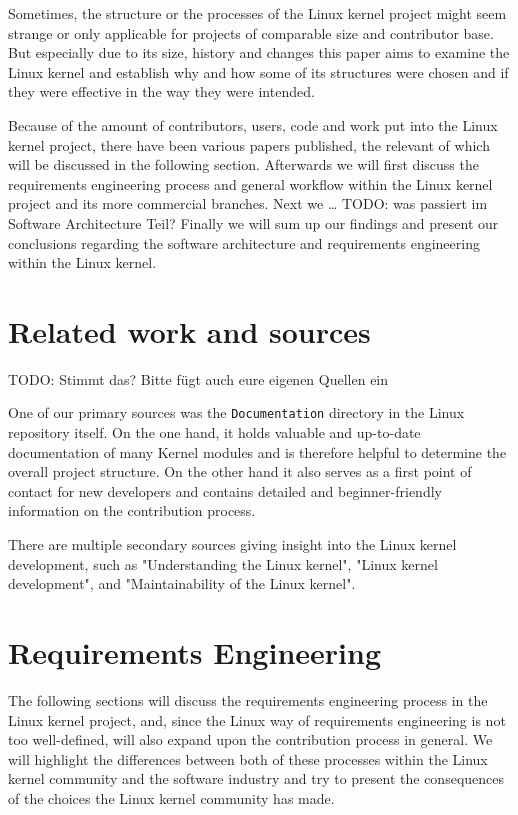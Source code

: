 \documentclass{sig-alternate-05-2015}
\begin{document}

Sometimes, the structure or the processes of the Linux kernel project might seem strange or only applicable for projects of comparable size and contributor base.
But especially due to its size, history and changes this paper aims to examine the Linux kernel and establish why and how some of its structures were chosen and if they were effective in the way they were intended.


Because of the amount of contributors, users, code and work put into the Linux kernel project, there have been various papers published, the relevant of which will be discussed in the following section.
Afterwards we will first discuss the requirements engineering process and general workflow within the Linux kernel project and its more commercial branches.
Next we … TODO: was passiert im Software Architecture Teil?
Finally we will sum up our findings and present our conclusions regarding the software architecture and requirements engineering within the Linux kernel.

\section{Related work and sources}

TODO: Stimmt das? Bitte fügt auch eure eigenen Quellen ein

One of our primary sources was the \texttt{Documentation} directory in the Linux repository itself.
On the one hand, it holds valuable and up-to-date documentation of many Kernel modules and is therefore helpful to determine the overall project structure.
On the other hand it also serves as a first point of contact for new developers and contains detailed and beginner-friendly information on the contribution process.

There are multiple secondary sources giving insight into the Linux kernel development, such as "Understanding the Linux kernel"\cite{bovet2005understanding}, "Linux kernel development"\cite{love2010linux}, and "Maintainability of the Linux kernel"\cite{schach2002maintainability}.


\section{Requirements Engineering}

The following sections will discuss the requirements engineering process in the Linux kernel project, and, since the Linux way of requirements engineering is not too well-defined, will also expand upon the contribution process in general.
We will highlight the differences between both of these processes within the Linux kernel community and the software industry and try to present the consequences of the choices the Linux kernel community has made.
\end{document}
